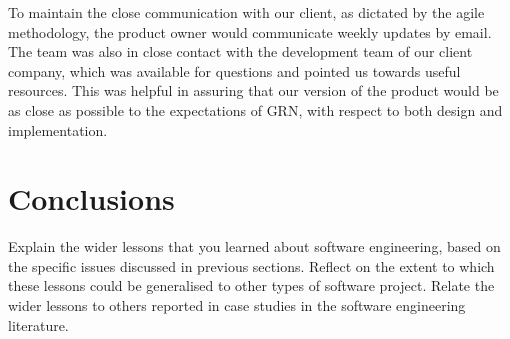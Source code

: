 \documentclass{l3proj}
\begin{document}
 To maintain the close communication with our client, as dictated by the agile methodology, the product owner would communicate weekly updates by email. The team was also in close contact with the development team of our client company, which was available for questions and pointed us towards useful resources. This was helpful in assuring that our version of the product would be as close as possible to the expectations of GRN, with respect to both design and implementation.
 
 
 
\newpage
\section{Conclusions}
\label{sec:conclusion}


Explain the wider lessons that you learned about software engineering,
based on the specific issues discussed in previous sections.  Reflect
on the extent to which these lessons could be generalised to other
types of software project.  Relate the wider lessons to others
reported in case studies in the software engineering literature.



\end{document}
